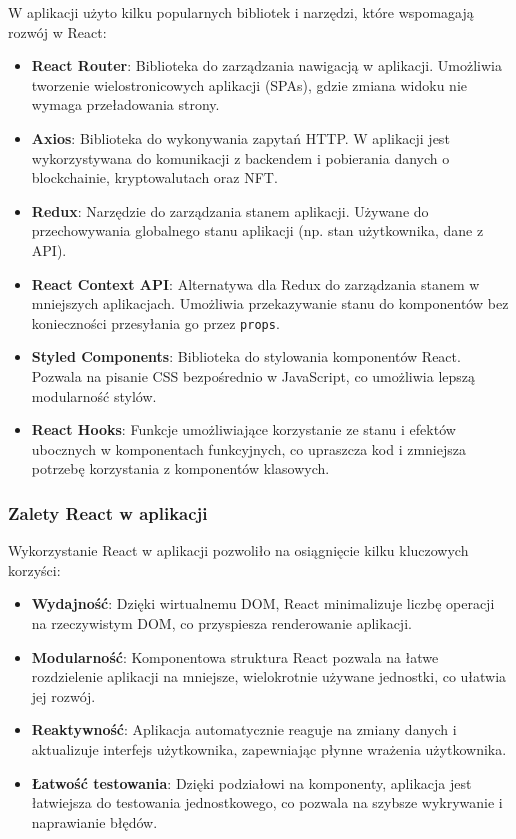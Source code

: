 W aplikacji użyto kilku popularnych bibliotek i narzędzi, które wspomagają rozwój w React:

\begin{itemize}
    \item \textbf{React Router}: Biblioteka do zarządzania nawigacją w aplikacji. Umożliwia tworzenie wielostronicowych aplikacji (SPAs), gdzie zmiana widoku nie wymaga przeładowania strony.
    \item \textbf{Axios}: Biblioteka do wykonywania zapytań HTTP. W aplikacji jest wykorzystywana do komunikacji z backendem i pobierania danych o blockchainie, kryptowalutach oraz NFT.
    \item \textbf{Redux}: Narzędzie do zarządzania stanem aplikacji. Używane do przechowywania globalnego stanu aplikacji (np. stan użytkownika, dane z API).
    \item \textbf{React Context API}: Alternatywa dla Redux do zarządzania stanem w mniejszych aplikacjach. Umożliwia przekazywanie stanu do komponentów bez konieczności przesyłania go przez \texttt{props}.
    \item \textbf{Styled Components}: Biblioteka do stylowania komponentów React. Pozwala na pisanie CSS bezpośrednio w JavaScript, co umożliwia lepszą modularność stylów.
    \item \textbf{React Hooks}: Funkcje umożliwiające korzystanie ze stanu i efektów ubocznych w komponentach funkcyjnych, co upraszcza kod i zmniejsza potrzebę korzystania z komponentów klasowych.
\end{itemize}

\subsubsection{Zalety React w aplikacji}

Wykorzystanie React w aplikacji pozwoliło na osiągnięcie kilku kluczowych korzyści:

\begin{itemize}
    \item \textbf{Wydajność}: Dzięki wirtualnemu DOM, React minimalizuje liczbę operacji na rzeczywistym DOM, co przyspiesza renderowanie aplikacji.
    \item \textbf{Modularność}: Komponentowa struktura React pozwala na łatwe rozdzielenie aplikacji na mniejsze, wielokrotnie używane jednostki, co ułatwia jej rozwój.
    \item \textbf{Reaktywność}: Aplikacja automatycznie reaguje na zmiany danych i aktualizuje interfejs użytkownika, zapewniając płynne wrażenia użytkownika.
    \item \textbf{Łatwość testowania}: Dzięki podziałowi na komponenty, aplikacja jest łatwiejsza do testowania jednostkowego, co pozwala na szybsze wykrywanie i naprawianie błędów.
\end{itemize}

